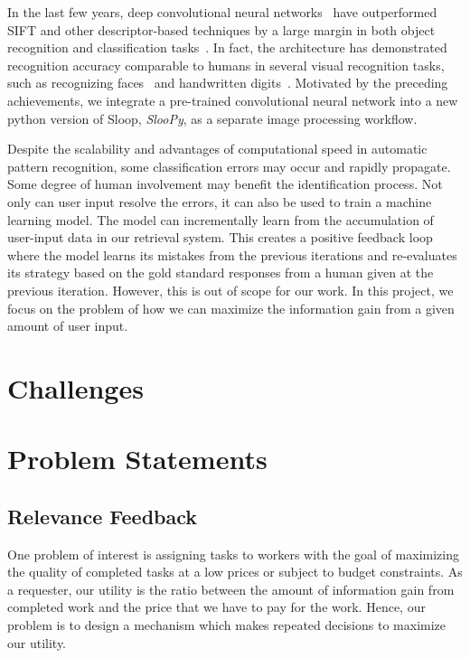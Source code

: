 In the last few years, deep convolutional neural networks~\cite{lecun95,
kriz12} have outperformed SIFT and other descriptor-based techniques by a large
margin in both object recognition and classification tasks~\cite{kriz12,
fisher14, ILSVRC15}. In fact, the architecture has demonstrated recognition
accuracy comparable to humans in several visual recognition tasks, such as
recognizing faces~\cite{deepface14} and handwritten digits~\cite{mnist13}.
Motivated by the preceding achievements, we integrate a pre-trained
convolutional neural network into a new python version of Sloop, \emph{SlooPy},
as a separate image processing workflow.

Despite the scalability and advantages of computational speed in automatic
pattern recognition, some classification errors may occur and rapidly
propagate. Some degree of human involvement may benefit the identification
process. Not only can user input resolve the errors, it can also be used to
train a machine learning model. The model can incrementally learn from the
accumulation of user-input data in our retrieval system. This creates a
positive feedback loop where the model learns its mistakes from the previous
iterations and re-evaluates its strategy based on the gold standard responses
from a human given at the previous iteration. However, this is out of scope for
our work. In this project, we focus on the problem of how we can maximize the
information gain from a given amount of user input.


\section{Challenges}

\section{Problem Statements}

\subsection{Relevance Feedback} %
\label{sub:relevance_feedback}

One problem of interest is assigning tasks to workers with the goal of
maximizing the quality of completed tasks at a low prices or subject to budget
constraints. As a requester, our utility is the ratio between the amount of
information gain from completed work and the price that we have to pay for the
work. Hence, our problem is to design a mechanism which makes repeated
decisions to maximize our utility.

